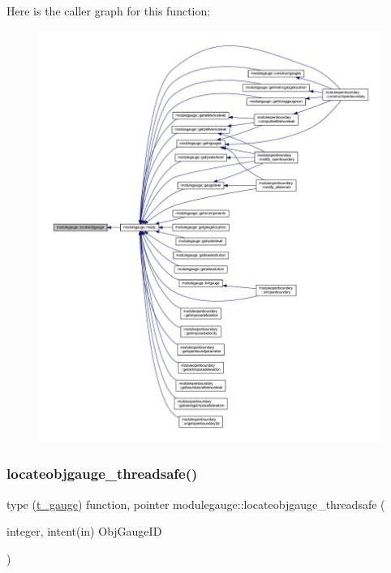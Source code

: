 Here is the caller graph for this function\+:\nopagebreak
\begin{figure}[H]
\begin{center}
\leavevmode
\includegraphics[width=350pt]{namespacemodulegauge_ad450a5738058992462096cd7d19b5a94_icgraph}
\end{center}
\end{figure}
\mbox{\label{namespacemodulegauge_a40155a54ed9673433a35e0eb72673928}} 
\subsubsection{\texorpdfstring{locateobjgauge\+\_\+threadsafe()}{locateobjgauge\_threadsafe()}}
{\footnotesize\ttfamily type (\mbox{\hyperlink{structmodulegauge_1_1t__gauge}{t\+\_\+gauge}}) function, pointer modulegauge\+::locateobjgauge\+\_\+threadsafe (\begin{DoxyParamCaption}\item[{integer, intent(in)}]{Obj\+Gauge\+ID }\end{DoxyParamCaption})\hspace{0.3cm}{\ttfamily [private]}}

